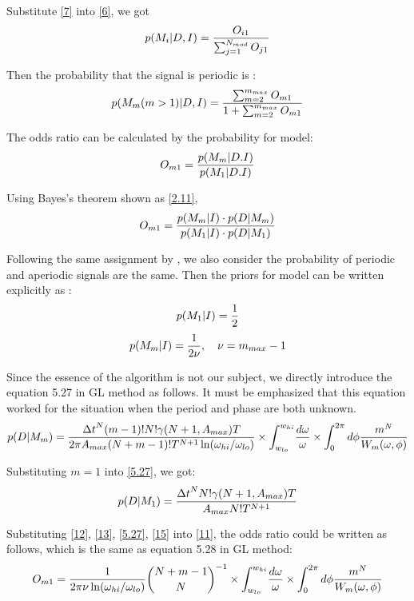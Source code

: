 \documentclass[twoside,twocolumn]{aastex63}
\begin{document}
Substitute \ref{7} into \ref{6}, we got
\begin{equation}\label{2.13}
p(M_i|D,I)={O_{i1}\over {\sum_{j=1}^{N_{mod}} O_{j1}}}
\end{equation}

Then the probability that the signal is periodic is :
\begin{equation}\label{5.2}
p(M_m(m>1)|D,I)={{\sum_{m=2}^{m_{max}} O_{m1}}\over {1+\sum_{m=2}^{m_{max}} O_{m1}}}
\end{equation}

The odds ratio can be calculated by the probability for model:
\begin{equation}
O_{m1}={{p(M_m|D.I)}\over {p(M_1|D.I)}}
\end{equation}

Using Bayes's theorem shown as \ref{2.11},
\begin{equation}\label{11}
O_{m1}={{p(M_m|I)\cdot p(D|M_m)}\over {p(M_1|I)\cdot p(D|M_1)}}
\end{equation}

Following the same assignment by \citep{1992ApJ...398..146G}, we also consider the probability of periodic and aperiodic signals are the same. Then the priors for model can be written explicitly as :
\begin{equation}\label{12}
p(M_1|I)={1\over 2}	
\end{equation}
\begin{equation}\label{13}
p(M_m|I)={1\over {2\nu}}	, \quad \nu =m_{max}-1
\end{equation}

Since the essence of the algorithm is not our subject, we directly introduce the equation 5.27 in GL method as follows. It must be emphasized that this equation worked for the situation when the period and phase are both unknown. 
\begin{equation}\label{5.27}
p(D|M_m)={{{\Delta t}^N (m-1)! N! \gamma(N+1,A_{max})T}\over{2\pi A_{max} (N+m-1)!T^{N+1} \ln(\omega_{hi}/\omega_{lo})}}\times {\int_{w_{lo}}^{w_{hi}}}{{d\omega}\over{\omega}}\times {\int_0^{2\pi}d\phi{m^N\over W_m(\omega,\phi)}}	
\end{equation}

Substituting $m=1$ into \ref{5.27}, we got:
\begin{equation}\label{15}
p(D|M_1)={{{\Delta t}^N N!\gamma(N+1,A_{max})T}\over {A_{max}N!T^{N+1}}}
\end{equation}

Substituting \ref{12}, \ref{13}, \ref{5.27}, \ref{15} into \ref{11}, the odds ratio could be written as follows, which is the same as equation 5.28 in GL method:
\begin{equation}\label{A16}
O_{m1}={1\over{2\pi \nu \ln(\omega_{hi}/\omega_{lo})}} {{N+m-1}	\choose N}^{-1}\times {\int_{w_{lo}}^{w_{hi}}}{{d\omega}\over{\omega}}\times {\int_0^{2\pi}d\phi{m^N\over W_m(\omega,\phi)}} 
\end{equation}
\end{document}
